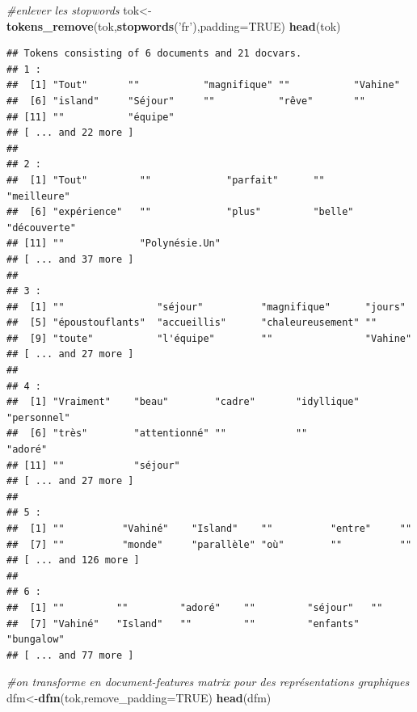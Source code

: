 \documentclass[
]{book}
\newenvironment{Shaded}{\begin{snugshade}}{\end{snugshade}}
\newcommand{\CommentTok}[1]{\textcolor[rgb]{0.56,0.35,0.01}{\textit{#1}}}
\newcommand{\DataTypeTok}[1]{\textcolor[rgb]{0.13,0.29,0.53}{#1}}
\newcommand{\KeywordTok}[1]{\textcolor[rgb]{0.13,0.29,0.53}{\textbf{#1}}}
\newcommand{\NormalTok}[1]{#1}
\newcommand{\OtherTok}[1]{\textcolor[rgb]{0.56,0.35,0.01}{#1}}
\newcommand{\StringTok}[1]{\textcolor[rgb]{0.31,0.60,0.02}{#1}}
\begin{document}
\begin{Shaded}
\begin{Highlighting}[]
\CommentTok{#enlever les stopwords}
\NormalTok{tok<-}\KeywordTok{tokens_remove}\NormalTok{(tok,}\KeywordTok{stopwords}\NormalTok{(}\StringTok{'fr'}\NormalTok{),}\DataTypeTok{padding=}\OtherTok{TRUE}\NormalTok{)}
\KeywordTok{head}\NormalTok{(tok)}
\end{Highlighting}
\end{Shaded}

\begin{verbatim}
## Tokens consisting of 6 documents and 21 docvars.
## 1 :
##  [1] "Tout"       ""           "magnifique" ""           "Vahine"    
##  [6] "island"     "Séjour"     ""           "rêve"       ""          
## [11] ""           "équipe"    
## [ ... and 22 more ]
## 
## 2 :
##  [1] "Tout"         ""             "parfait"      ""             "meilleure"   
##  [6] "expérience"   ""             "plus"         "belle"        "découverte"  
## [11] ""             "Polynésie.Un"
## [ ... and 37 more ]
## 
## 3 :
##  [1] ""                "séjour"          "magnifique"      "jours"          
##  [5] "époustouflants"  "accueillis"      "chaleureusement" ""               
##  [9] "toute"           "l'équipe"        ""                "Vahine"         
## [ ... and 27 more ]
## 
## 4 :
##  [1] "Vraiment"    "beau"        "cadre"       "idyllique"   "personnel"  
##  [6] "très"        "attentionné" ""            ""            "adoré"      
## [11] ""            "séjour"     
## [ ... and 27 more ]
## 
## 5 :
##  [1] ""          "Vahiné"    "Island"    ""          "entre"     ""         
##  [7] ""          "monde"     "parallèle" "où"        ""          ""         
## [ ... and 126 more ]
## 
## 6 :
##  [1] ""         ""         "adoré"    ""         "séjour"   ""        
##  [7] "Vahiné"   "Island"   ""         ""         "enfants"  "bungalow"
## [ ... and 77 more ]
\end{verbatim}

\begin{Shaded}
\begin{Highlighting}[]
\CommentTok{#on transforme en document-features matrix pour des représentations graphiques}
\NormalTok{dfm<-}\KeywordTok{dfm}\NormalTok{(tok,}\DataTypeTok{remove_padding=}\OtherTok{TRUE}\NormalTok{)}
\KeywordTok{head}\NormalTok{(dfm)}
\end{Highlighting}
\end{Shaded}
\end{document}
